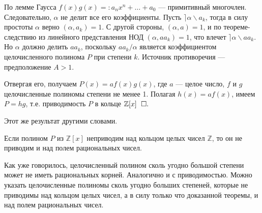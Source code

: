 \documentclass{article}
\begin{document}
По лемме Гаусса $f(x)g(x)=:a_n x^n+\ldots +a_0$ --- примитивный многочлен.
Следовательно, $\alpha$ не делит все его коэффициенты. Пусть $\rceil\alpha\backslash a_k$, тогда в силу простоты $\alpha$ верно $(\alpha , a_k)=1$.
С другой стороны, $(\alpha , a)=1$, и по теореме-следствию из линейного представления НОД $(\alpha , a a_k)=1$, что влечет $\rceil\alpha\backslash a a_k$. Но $\alpha$ должно делить $a a_k$, поскольку $a a_k/\alpha$ является коэффициентом целочисленного полинома $P$ при степени $k$.
Источник противоречия --- предположение $A > 1$. \newline

Отвергая его, получаем $P(x)=a f(x) g(x)$, где $a$ --- целое число, $f$ и $g$ целочисленные полиномы степени не менее 1. Полагая $h(x) = a f(x)$, имеем $P = hg$, т.е. приводимость $P$ в кольце $\mathbb{Z} [x]~\qed$

Этот же результат другими словами. \newpage

\theorem[6.33]

Если полином $P$ из $\mathbb{Z} [x]$ неприводим над кольцом целых чисел $\mathbb{Z}$, то он не приводим и над полем рациональных чисел.\newline

Как уже говорилось, целочисленный полином сколь угодно большой степени может
не иметь рациональных корней. Аналогично и с приводимостью. Можно указать целочисленные полиномы сколь угодно больших степеней, которые не приводимы над кольцом
целых чисел, а в силу только что доказанной теоремы, и над полем рациональных чисел.
\end{document}
